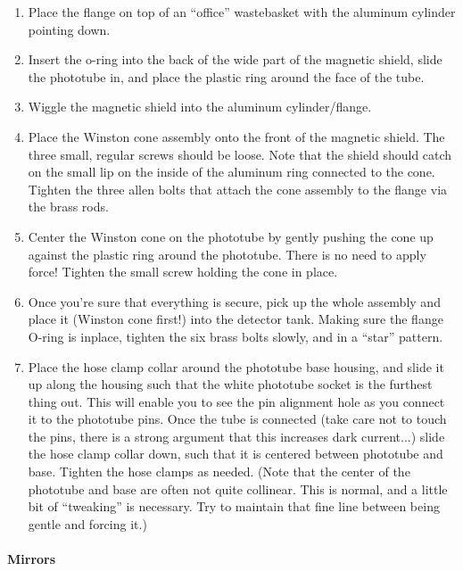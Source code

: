 \begin{obsolete}
\begin{enumerate}
\item  Place the flange on top of an ``office'' wastebasket with the aluminum
cylinder pointing down.

\item  Insert the o-ring into the back of the wide part of the magnetic
shield, slide the phototube in, and place the plastic ring around the
face of the tube.

\item  Wiggle the magnetic shield into the aluminum cylinder/flange.

\item  Place the Winston cone assembly onto the front of the magnetic
shield.  The three small, regular screws should be loose.  Note that
the shield should catch on the small lip on the inside of the aluminum
ring connected to the cone.  Tighten the three allen bolts that attach
the cone assembly to the flange via the brass rods.

\item Center the Winston cone on the phototube by gently pushing the cone
up against the plastic ring around the phototube.  There is no need to
apply force!  Tighten the small screw holding the cone in place.

\item Once you're sure that everything is secure, pick up the whole
assembly and place it (Winston cone first!) into the detector tank.
Making sure the flange O-ring is inplace, tighten the six brass bolts
slowly, and in a ``star'' pattern.

\item Place the hose clamp collar around the phototube base housing, and
slide it up along the housing such that the white phototube socket is
the furthest thing out.  This will enable you to see the pin alignment
hole as you connect it to the phototube pins.  Once the tube is
connected (take care not to touch the pins, there is a strong argument
that this increases dark current...) slide the hose clamp collar down,
such that it is centered between phototube and base.  Tighten the hose
clamps as needed.  (Note that the center of the phototube and base are
often not quite collinear.  This is normal, and a little bit of
``tweaking'' is necessary.  Try to maintain that fine line between being
gentle and forcing it.)
\end{enumerate}

\paragraph{Mirrors}


\end{obsolete}
